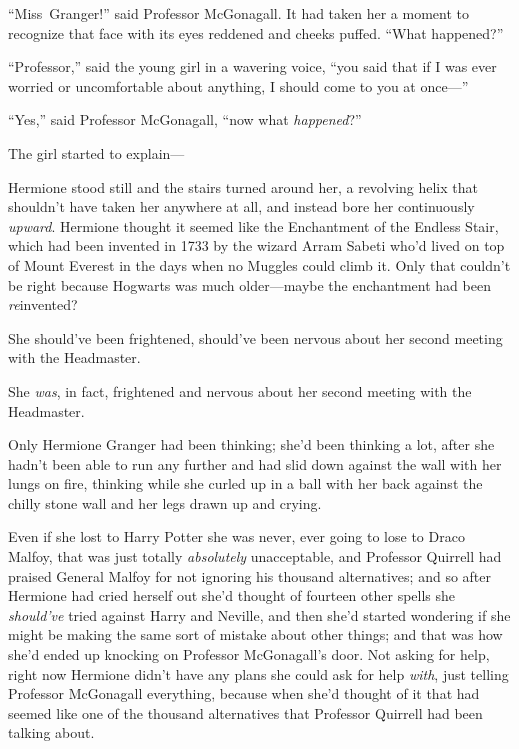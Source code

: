 “Miss~Granger!” said Professor McGonagall. It had taken her a moment to recognize that face with its eyes reddened and cheeks puffed. “What happened?”

“Professor,” said the young girl in a wavering voice, “you said that if I was ever worried or uncomfortable about anything, I should come to you at once—”

“Yes,” said Professor McGonagall, “now what \emph{happened}?”

The girl started to explain—

\later

Hermione stood still and the stairs turned around her, a revolving helix that shouldn’t have taken her anywhere at all, and instead bore her continuously \emph{upward}. Hermione thought it seemed like the Enchantment of the Endless Stair, which had been invented in 1733 by the wizard Arram Sabeti who’d lived on top of Mount Everest in the days when no Muggles could climb it. Only that couldn’t be right because Hogwarts was much older—maybe the enchantment had been \emph{re}invented?

She should’ve been frightened, should’ve been nervous about her second meeting with the Headmaster.

She \emph{was}, in fact, frightened and nervous about her second meeting with the Headmaster.

Only Hermione Granger had been thinking; she’d been thinking a lot, after she hadn’t been able to run any further and had slid down against the wall with her lungs on fire, thinking while she curled up in a ball with her back against the chilly stone wall and her legs drawn up and crying.

Even if she lost to Harry Potter she was never, ever going to lose to Draco Malfoy, that was just totally \emph{absolutely} unacceptable, and Professor Quirrell had praised General Malfoy for not ignoring his thousand alternatives; and so after Hermione had cried herself out she’d thought of fourteen other spells she \emph{should’ve} tried against Harry and Neville, and then she’d started wondering if she might be making the same sort of mistake about other things; and that was how she’d ended up knocking on Professor McGonagall’s door. Not asking for help, right now Hermione didn’t have any plans she could ask for help \emph{with}, just telling Professor McGonagall everything, because when she’d thought of it that had seemed like one of the thousand alternatives that Professor Quirrell had been talking about.

